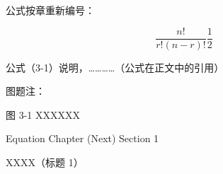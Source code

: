 \documentclass[UTF8, scheme=chinese, openany, oneside]{ctexbook}
\begin{document}

\vspace{0.3cm}

\vspace{1.2cm}

\hspace*{2em}公式按章重新编号：

\vspace{0.6cm}

\begin{equation}
    \frac{n!}{r!(n-r)!} \frac{1}{2} \tag{3-1} \label{eq:3-1}
\end{equation}

\vspace{1.8cm}

\hspace*{2em}公式（3-1）说明，…………（公式在正文中的引用）

\vspace{3.5cm}

\hspace*{2em}图题注：

\vspace{0.8cm}

\begin{center}
     图 3-1 \quad XXXXXX
\end{center}

\newpage
{}
\vfill
\begin{center}
    {\color{white} Equation Chapter (Next) Section 1}
\end{center}
\vfill


\clearpage
\setcounter{chapter}{3} %
\setcounter{page}{10}    %


\vspace{1cm}
\begin{center}
{ \quad XXXX（标题 1）}
\end{center}
\vspace{0.8cm}
\end{document}
